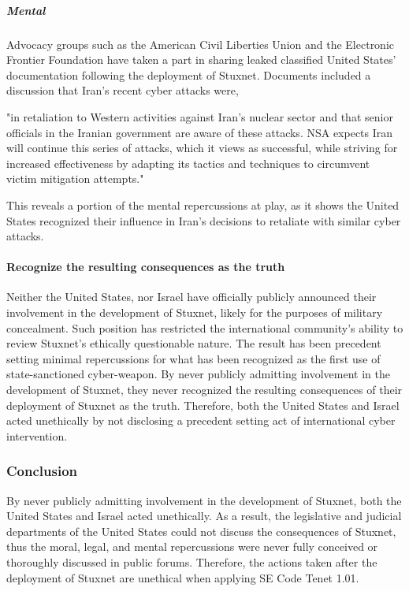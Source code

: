 \documentclass[12pt]{article}
\begin{document}
\begin{multicols}{2}
\subparagraph{Mental}

Advocacy groups such as the American Civil Liberties Union and the Electronic Frontier Foundation have taken a part in sharing leaked classified United States' documentation following the deployment of Stuxnet. Documents included a discussion that Iran's recent cyber attacks were, 

\begin{displayquote}
"in retaliation to Western activities against Iran's nuclear sector and that senior officials in the Iranian government are aware of these attacks. NSA expects Iran will continue this series of attacks, which it views as successful, while striving for increased effectiveness by adapting its tactics and techniques to circumvent victim mitigation attempts."\cite{effForwardsIranDiscussion}\cite{acluForwardsIranDiscussion}
\end{displayquote}

This reveals a portion of the mental repercussions at play, as it shows the United States recognized their influence in Iran's decisions to retaliate with similar cyber attacks.  

\paragraph{Recognize the resulting consequences as the truth}

Neither the United States, nor Israel have officially publicly announced their involvement in the development of Stuxnet, likely for the purposes of military concealment. Such position has restricted the international community's ability to review Stuxnet's ethically questionable nature. The result has been precedent setting minimal repercussions for what has been recognized as the first use of state-sanctioned cyber-weapon. By never publicly admitting involvement in the development of Stuxnet, they never recognized the resulting consequences of their deployment of Stuxnet as the truth. Therefore, both the United States and Israel acted unethically by not disclosing a precedent setting act of international cyber intervention.

\subsubsection{Conclusion}

By never publicly admitting involvement in the development of Stuxnet, both the United States and Israel acted unethically. As a result, the legislative and judicial departments of the United States could not discuss the consequences of Stuxnet, thus the moral, legal, and mental repercussions were never fully conceived or thoroughly discussed in public forums. Therefore, the actions taken after the deployment of Stuxnet are unethical when applying SE Code Tenet 1.01.



\end{multicols}
\end{document}
